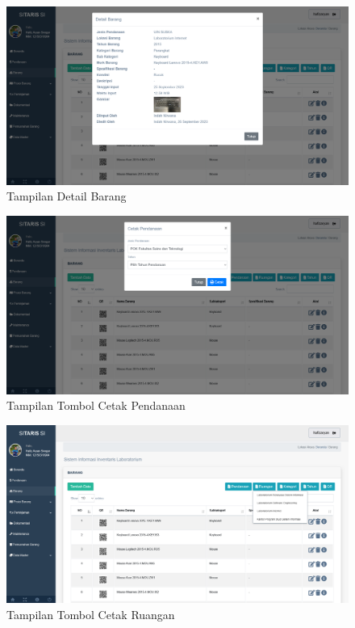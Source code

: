 \begin{enumerate}
        \begin{figure}
          \centering
          \includegraphics[width=0.82\linewidth]{konten//gambar/barang detail.png}
          \caption{Tampilan Detail Barang}
          \label{fig:enter-label}
        \end{figure}

        \begin{figure}
          \centering
          \includegraphics[width=0.82\linewidth]{konten//gambar/barang cetak pendanaan.png}
          \caption{Tampilan Tombol Cetak Pendanaan}
          \label{fig:enter-label}
        \end{figure}

        \begin{figure}
          \centering
          \includegraphics[width=0.82\linewidth]{konten//gambar/barang cetak ruangan.png}
          \caption{Tampilan Tombol Cetak Ruangan}
          \label{fig:enter-label}
        \end{figure}


\end{enumerate}
